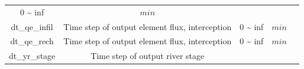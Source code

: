 \documentclass[]{scrbook}
\begin{document}
\begin{longtable}[]{@{}ccccc@{}}
\begin{minipage}[t]{0.10\columnwidth}
0 \textasciitilde{} inf\strut
\end{minipage} & \begin{minipage}[t]{0.10\columnwidth}\centering\strut
\(min\)\strut
\end{minipage} & \begin{minipage}[t]{0.26\columnwidth}\centering\strut
\strut
\end{minipage}\tabularnewline
\begin{minipage}[t]{0.17\columnwidth}\centering\strut
dt\_qe\_infil\strut
\end{minipage} & \begin{minipage}[t]{0.23\columnwidth}\centering\strut
Time step of output element flux, interception\strut
\end{minipage} & \begin{minipage}[t]{0.10\columnwidth}\centering\strut
0 \textasciitilde{} inf\strut
\end{minipage} & \begin{minipage}[t]{0.10\columnwidth}\centering\strut
\(min\)\strut
\end{minipage} & \begin{minipage}[t]{0.26\columnwidth}\centering\strut
\strut
\end{minipage}\tabularnewline
\begin{minipage}[t]{0.17\columnwidth}\centering\strut
dt\_qe\_rech\strut
\end{minipage} & \begin{minipage}[t]{0.23\columnwidth}\centering\strut
Time step of output element flux, interception\strut
\end{minipage} & \begin{minipage}[t]{0.10\columnwidth}\centering\strut
0 \textasciitilde{} inf\strut
\end{minipage} & \begin{minipage}[t]{0.10\columnwidth}\centering\strut
\(min\)\strut
\end{minipage} & \begin{minipage}[t]{0.26\columnwidth}\centering\strut
\strut
\end{minipage}\tabularnewline
\begin{minipage}[t]{0.17\columnwidth}\centering\strut
dt\_yr\_stage\strut
\end{minipage} & \begin{minipage}[t]{0.23\columnwidth}\centering\strut
Time step of output river stage\strut
\end{minipage} & \begin{minipage}[t]{0.10\columnwidth}\centering\strut

\end{minipage}
\end{longtable}
\end{document}
